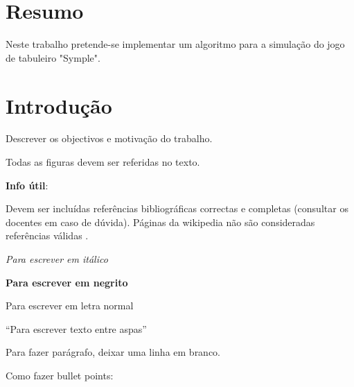 \documentclass[a4paper]{article}
\begin{document}
\newpage

\section*{Resumo}
Neste trabalho pretende-se implementar um algoritmo para a simulação do jogo de tabuleiro "Symple".





\section{Introdução}
Descrever os objectivos e motivação do trabalho.

Todas as figuras devem ser referidas no texto. %




\textbf{Info útil}:

Devem ser incluídas referências bibliográficas correctas e completas (consultar os docentes em caso de dúvida). Páginas da wikipedia não são consideradas referências válidas \cite{CodigoSite, CodigoLivro}.

\textit{Para escrever em itálico}

\textbf{Para escrever em negrito}

Para escrever em letra normal

``Para escrever texto entre aspas''

Para fazer parágrafo, deixar uma linha em branco.

Como fazer bullet points:
\end{document}
